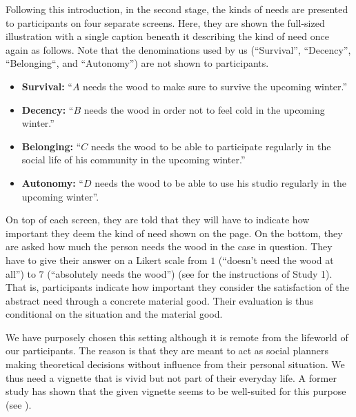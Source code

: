 \documentclass[10pt,letterpaper]{article}
\begin{document}
Following this introduction, in the second stage, the kinds of needs are presented to participants on four separate screens. 
Here, they are shown the full-sized illustration with a single caption beneath it describing the kind of need once again as follows.
Note that the denominations used by us (``Survival'', ``Decency'', ``Belonging``, and ``Autonomy'') are not shown to participants.

\begin{itemize}
   \item \textbf{Survival:} ``$A$ needs the wood to make sure to survive the upcoming winter.''
   \item \textbf{Decency:} ``$B$ needs the wood in order not to feel cold in the upcoming winter.''
   \item \textbf{Belonging:} ``$C$ needs the wood to be able to participate regularly in the social life of his community in the upcoming winter.''
   \item \textbf{Autonomy:} ``$D$ needs the wood to be able to use his studio regularly in the upcoming winter''.
\end{itemize}

On top of each screen, they are told that they will have to indicate how important they deem the kind of need shown on the page.
On the bottom, they are asked how much the person needs the wood in the case in question.
They have to give their answer on a Likert scale from $1$ (``doesn't need the wood at all'') to $7$ (``absolutely needs the wood'') (see  for the instructions of Study 1).
That is, participants indicate how important they consider the satisfaction of the abstract need through a concrete material good.
Their evaluation is thus conditional on the situation and the material good.

We have purposely chosen this setting although it is remote from the lifeworld of our participants.
The reason is that they are meant to act as social planners making theoretical decisions without influence from their personal situation.
We thus need a vignette that is vivid but not part of their everyday life.
A former study has shown that the given vignette seems to be well-suited for this purpose (see \cite{bauer_need_2022}).


\end{document}
